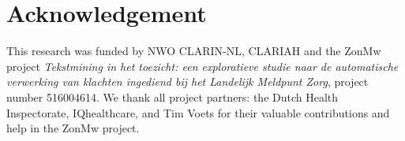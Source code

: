 \documentclass[a4paper,11pt]{article}
\begin{document}
\section*{Acknowledgement}

This research was funded by NWO CLARIN-NL, CLARIAH and the ZonMw project {\it Tekstmining in het toezicht: een exploratieve studie naar de automatische verwerking van klachten ingediend bij het Landelijk Meldpunt Zorg}, project number 516004614. We thank all project partners: the Dutch Health Inspectorate, IQhealthcare, and Tim Voets for their valuable contributions and help in the ZonMw project.



\end{document}
